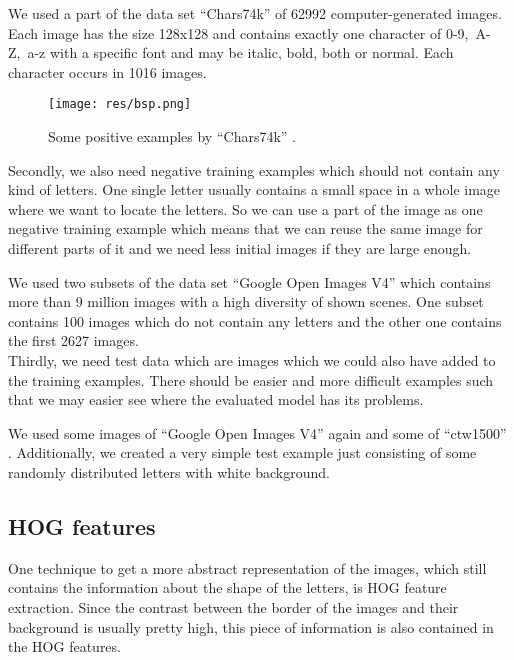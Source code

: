 \documentclass[conference]{IEEEtran}
\begin{document}
We used a part of the data set ``Chars74k'' \cite{bib:chars74k} of 62992 computer-generated images. Each image has the size 128x128 and contains exactly one character of \mbox{0-9, A-Z, a-z} with a specific font and may be italic, bold, both or normal. Each character occurs in 1016 images. \\[-5pt]

\begin{figure}[htbp]
\centerline{\texttt{[image: res/bsp.png]}}
\caption{Some positive examples by ``Chars74k'' \cite{bib:chars74k}.}
\label{fig:bsp}
\end{figure}

Secondly, we also need negative training examples which should not contain any kind of letters. One single letter usually contains a small space in a whole image where we want to locate the letters. So we can use a part of the image as one negative training example which means that we can reuse the same image for different parts of it and we need less initial images if they are large enough.

We used two subsets of the data set ``Google Open Images V4'' \cite{bib:openImg} which contains more than 9 million images with a high diversity of shown scenes. One subset contains 100 images which do not contain any letters and the other one contains the first 2627 images. \\[-5pt]

Thirdly, we need test data which are images which we could also have added to the training examples. There should be easier and more difficult examples such that we may easier see where the evaluated model has its problems.

We used some images of ``Google Open Images V4'' \cite{bib:openImg} again and some of ``ctw1500'' \cite{bib:ctw}. Additionally, we created a very simple test example just consisting of some randomly distributed letters with white background.

\subsection{HOG features}\label{sec:hog}

One technique to get a more abstract representation of the images, which still contains the information about the shape of the letters, is HOG feature extraction. Since the contrast between the border of the images and their background is usually pretty high, this piece of information is also contained in the HOG features.
\end{document}
